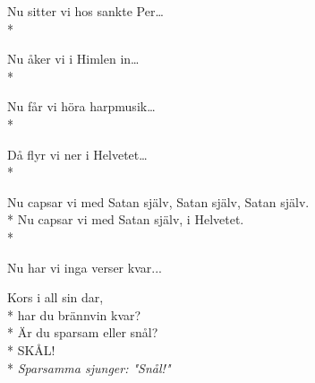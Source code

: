 \begin{SongText}
\begin{SongVerse}
        Nu sitter vi hos sankte Per…\\*%
    \end{SongVerse}
    \begin{SongVerse}
        Nu åker vi i Himlen in…\\*%
    \end{SongVerse}
    \begin{SongVerse}
        Nu får vi höra harpmusik…\\*%
    \end{SongVerse}
    \begin{SongVerse}
        Då flyr vi ner i Helvetet…\\*%
    \end{SongVerse}
    \begin{SongVerse}
        Nu capsar vi med Satan själv, Satan själv,
        Satan själv.\\*%
        Nu capsar vi med Satan själv, i Helvetet.\\*%
    \end{SongVerse}
    Nu har vi inga verser kvar...
\end{SongText}
\begin{SongText}[Hyfsvisa]
    \begin{SongVerse}
        Kors i all sin dar,\\*%
        har du brännvin kvar?\\*%
        Är du sparsam eller snål?\\*%
        SKÅL!\\*%
        \emph{Sparsamma sjunger: "Snål!"}
    \end{SongVerse}
\end{SongText}
